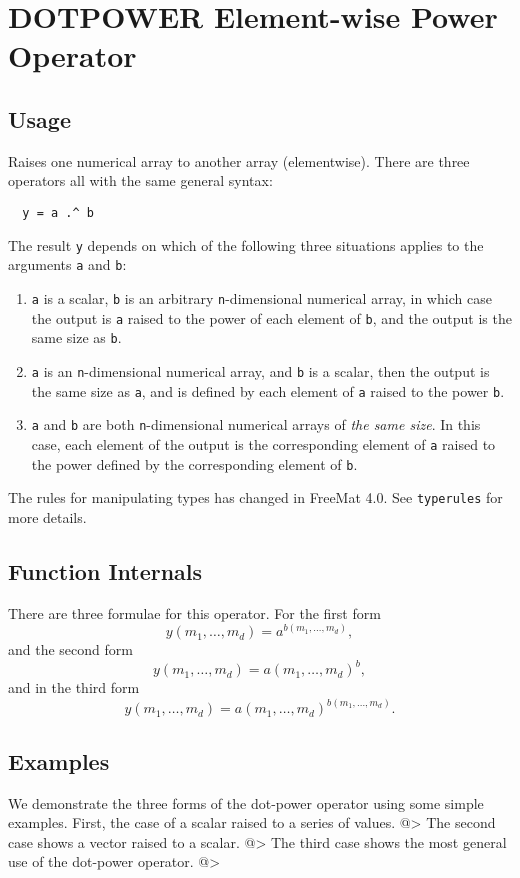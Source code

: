 \section{DOTPOWER Element-wise Power Operator}

\subsection{Usage}

Raises one numerical array to another array (elementwise).  There are three operators all with the same general syntax:
\begin{verbatim}
  y = a .^ b
\end{verbatim}
The result \verb|y| depends on which of the following three situations applies to the arguments \verb|a| and \verb|b|:
\begin{enumerate}
\item  \verb|a| is a scalar, \verb|b| is an arbitrary \verb|n|-dimensional numerical array, in which case the output is \verb|a| raised to the power of each element of \verb|b|, and the output is the same size as \verb|b|.

\item  \verb|a| is an \verb|n|-dimensional numerical array, and \verb|b| is a scalar, then the output is the same size as \verb|a|, and is defined by each element of \verb|a| raised to the power \verb|b|.

\item  \verb|a| and \verb|b| are both \verb|n|-dimensional numerical arrays of \emph{the same size}.  In this case, each element of the output is the corresponding element of \verb|a| raised to the power defined by the corresponding element of \verb|b|.

\end{enumerate}

The rules for manipulating types has changed in FreeMat 4.0.  See \verb|typerules|
for more details.

\subsection{Function Internals}

There are three formulae for this operator.  For the first form
\[
y(m_1,\ldots,m_d) = a^{b(m_1,\ldots,m_d)},
\]
and the second form
\[
y(m_1,\ldots,m_d) = a(m_1,\ldots,m_d)^b,
\]
and in the third form
\[
y(m_1,\ldots,m_d) = a(m_1,\ldots,m_d)^{b(m_1,\ldots,m_d)}.
\]
\subsection{Examples}

We demonstrate the three forms of the dot-power operator using some simple examples.  First, the case of a scalar raised to a series of values.
@>
The second case shows a vector raised to a scalar.
@>
The third case shows the most general use of the dot-power operator.
@>
